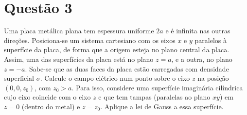 \documentclass[11pt]{article}
\begin{document}
\section{Questão 3}
\label{sec:org377b857}
Uma placa metálica plana tem espessura uniforme \(2a\) e é infinita nas
outras direções. Posiciona-se um sistema cartesiano com os eixos \(x\) e
\(y\) paralelos à superfície da placa, de forma que a origem esteja no
plano central da placa. Assim, uma das superfícies da placa está no
plano \(z=a\), e a outra, no plano \(z = -a\). Sabe-se que as duas faces da
placa estão carregadas com densidade superficial \(\sigma\). Calcule o campo
elétrico num ponto sobre o eixo \(z\) na posição \((0,0,z_0)\), com \(z_0
>a\). Para isso, considere uma superfície imaginária cilíndrica cujo eixo
coincide com o eixo \(z\) e que tem tampas (paralelas ao plano \(xy\)) em
\(z=0\) (dentro do metal) e \(z=z_0\). Aplique a lei de Gauss a essa
superfície. 
\end{document}
